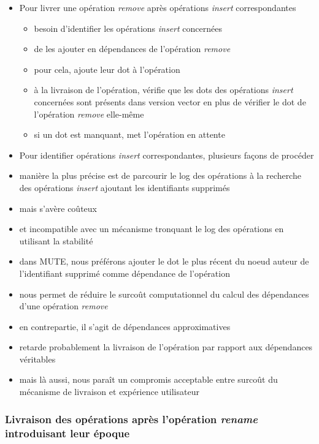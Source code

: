 \documentclass[12pt]{thesul}
\begin{document}
\begin{itemize}
  \item Pour livrer une opération \emph{remove} après opérations \emph{insert} correspondantes
  \begin{itemize}
    \item besoin d'identifier les opérations \emph{insert} concernées
    \item de les ajouter en dépendances de l'opération \emph{remove}
    \item pour cela, ajoute leur dot à l'opération
    \item à la livraison de l'opération, vérifie que les dots des opérations \emph{insert} concernées sont présents dans version vector en plus de vérifier le dot de l'opération \emph{remove} elle-même
    \item si un dot est manquant, met l'opération en attente
  \end{itemize}
  \item Pour identifier opérations \emph{insert} correspondantes, plusieurs façons de procéder
  \item manière la plus précise est de parcourir le log des opérations à la recherche des opérations \emph{insert} ajoutant les identifiants supprimés
  \item mais s'avère coûteux
  \item et incompatible avec un mécanisme tronquant le log des opérations en utilisant la stabilité
  \item dans MUTE, nous préférons ajouter le dot le plus récent du noeud auteur de l'identifiant supprimé comme dépendance de l'opération
  \item nous permet de réduire le surcoût computationnel du calcul des dépendances d'une opération \emph{remove}
  \item en contrepartie, il s'agit de dépendances approximatives
  \item retarde probablement la livraison de l'opération par rapport aux dépendances véritables
  \item mais là aussi, nous paraît un compromis acceptable entre surcoût du mécanisme de livraison et expérience utilisateur
\end{itemize}

\subsubsection{Livraison des opérations après l'opération \emph{rename} introduisant leur époque}
\end{document}
